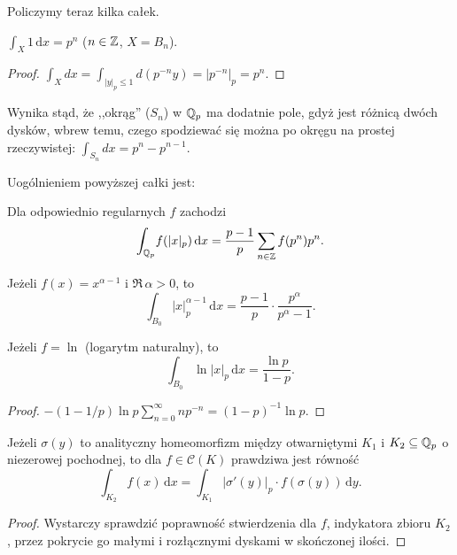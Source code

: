 Policzymy teraz kilka całek. %

\begin{przyklad}
	$\int_{X} \! 1 \,\textrm{d}x = p^n$ ($n \in \mathbb Z$, $X = B_n$).
\end{przyklad}

\begin{proof}$\int_X dx = \int_{|y|_p \le 1} d(p^{-n}y) = |p^{-n}|_p = p^n$.
\end{proof}

Wynika stąd, że ,,okrąg'' ($S_n$) w $\mathbb Q_p$ ma dodatnie pole, gdyż jest różnicą dwóch dysków, wbrew temu, czego spodziewać się można po okręgu na prostej rzeczywistej: $\int_{S_n} dx = p^n - p^{n-1}$.

Uogólnieniem powyższej całki jest:

\begin{fakt}
	Dla odpowiednio regularnych $f$ zachodzi
	\[
		\int_{\mathbb Q_p} \! f(|x|_p) \,\textrm{d}x = \frac{p-1}{p} \sum_{n \in \mathbb Z} f(p^n) p^n.
	\]
\end{fakt}

\begin{wniosek}
	Jeżeli $f (x) = x^{\alpha - 1}$ i $\Re \, \alpha > 0$, to
	\[
		\int_{B_0} |x|_p^{\alpha - 1} \, \textrm{d} x = \frac{p-1}{p} \cdot \frac{p^\alpha}{p^\alpha - 1}.
	\]
\end{wniosek}

\begin{wniosek}
	Jeżeli $f = \ln$ (logarytm naturalny), to 
	\[
		\int_{B_0} \ln |x|_p \, \textrm{d} x = \frac{\ln p}{1 - p}.
	\]
\end{wniosek}

\begin{proof}
	$- (1 - 1/p)\ln p \sum_{n = 0}^\infty n{p^{-n}} = (1-p)^{-1} \ln p$.
\end{proof}

\begin{fakt}
	Jeżeli $\sigma(y)$ to analityczny homeomorfizm między otwarniętymi $K_1$ i $K_2 \subseteq \mathbb Q_p$ o niezerowej pochodnej, to dla $f \in \mathcal C(K)$ prawdziwa jest równość
	\[
		\int_{K_2} \!f(x)\,\textrm{d}x = \int_{K_1}\! |\sigma'(y)|_p \cdot f(\sigma(y)) \,\textrm{d}y.
	\]
\end{fakt}

\begin{proof}
	Wystarczy sprawdzić poprawność stwierdzenia dla $f$, indykatora zbioru $K_2$, przez pokrycie go małymi i rozłącznymi dyskami w skończonej ilości.
\end{proof}

